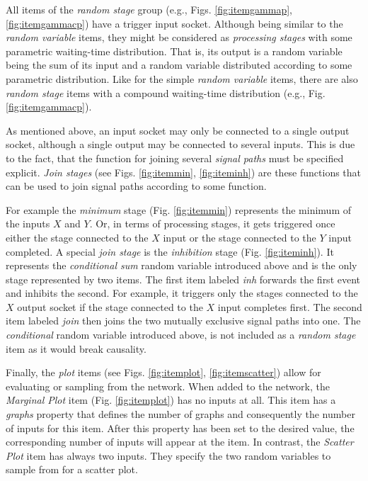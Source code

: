 All items of the \emph{random stage} group (e.g., Figs. \ref{fig:itemgammap}, \ref{fig:itemgammacp}) have a trigger input socket. Although being similar to the \emph{random variable} items, they might be considered as \emph{processing stages} with some parametric waiting-time distribution. That is, its output is a random variable being the sum of its input and a random variable distributed according to some parametric distribution. Like for the simple \emph{random variable} items, there are also \emph{random stage} items with a compound waiting-time distribution (e.g., Fig. \ref{fig:itemgammacp}).

As mentioned above, an input socket may only be connected to a single output socket, although a single output may be connected to several inputs. This is due to the fact, that the function for joining several \emph{signal paths} must be specified explicit. \emph{Join stages} (see Figs. \ref{fig:itemmin}, \ref{fig:iteminh}) are these functions that can be used to join signal paths according to some function. 

For example the \emph{minimum} stage (Fig. \ref{fig:itemmin}) represents the minimum of the inputs $X$ and $Y$. Or, in terms of processing stages, it gets triggered once either the stage connected to the $X$ input or the stage connected to the $Y$ input completed. A special \emph{join stage} is the \emph{inhibition} stage (Fig. \ref{fig:iteminh}). It represents the \emph{conditional sum} random variable introduced above and is the only stage represented by two items. The first item labeled \emph{inh} forwards the first event and inhibits the second. For example, it triggers only the stages connected to the $X$ output socket if the stage connected to the $X$ input completes first. The second item labeled \emph{join} then joins the two mutually exclusive signal paths into one. The \emph{conditional} random variable introduced above, is not included as a \emph{random stage} item as it would break causality.

Finally, the \emph{plot} items (see Figs. \ref{fig:itemplot}, \ref{fig:itemscatter}) allow for evaluating or sampling from the network. When added to the network, the \emph{Marginal Plot} item (Fig. \ref{fig:itemplot}) has no inputs at all. This item has a \emph{graphs} property that defines the number of graphs and consequently the number of inputs for this item. After this property has been set to the desired value, the corresponding number of inputs will appear at the item. In contrast, the \emph{Scatter Plot} item has always two inputs. They specify the two random variables to sample from for a scatter plot.


